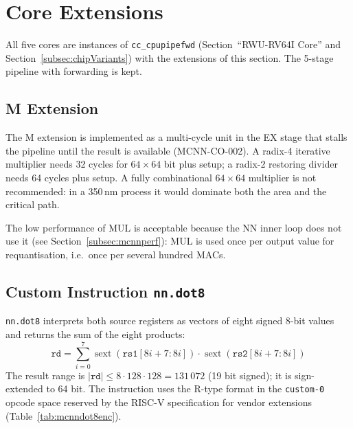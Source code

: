 \section{Core Extensions}
\label{sec:mcnncore}

All five cores are instances of \texttt{cc\_cpupipefwd}
(Section~``RWU-RV64I Core'' and Section~\ref{subsec:chipVariants}) with
the extensions of this section.
The 5-stage pipeline with forwarding is kept.

\subsection{M Extension}
\label{subsec:mcnnmext}

The M extension is implemented as a multi-cycle unit in the EX stage that
stalls the pipeline until the result is available (MCNN-CO-002).
A radix-4 iterative multiplier needs 32 cycles for $64\times64$ bit plus
setup; a radix-2 restoring divider needs 64 cycles plus setup.
A fully combinational $64\times64$ multiplier is not recommended: in a
350\,nm process it would dominate both the area and the critical path.

The low performance of MUL is acceptable because the NN inner loop does not
use it (see Section~\ref{subsec:mcnnperf}): MUL is used once per output
value for requantisation, i.e.\ once per several hundred MACs.

\subsection{Custom Instruction \texttt{nn.dot8}}
\label{subsec:mcnndot8}

\texttt{nn.dot8} interprets both source registers as vectors of eight
signed 8-bit values and returns the sum of the eight products:
\[
  \texttt{rd} = \sum_{i=0}^{7}
     \operatorname{sext}\!\left(\texttt{rs1}[8i{+}7:8i]\right) \cdot
     \operatorname{sext}\!\left(\texttt{rs2}[8i{+}7:8i]\right)
\]
The result range is $|\texttt{rd}| \leq 8 \cdot 128 \cdot 128 = 131\,072$
(19 bit signed); it is sign-extended to 64 bit.
The instruction uses the R-type format in the \texttt{custom-0} opcode
space reserved by the RISC-V specification for vendor extensions
(Table~\ref{tab:mcnndot8enc}).

